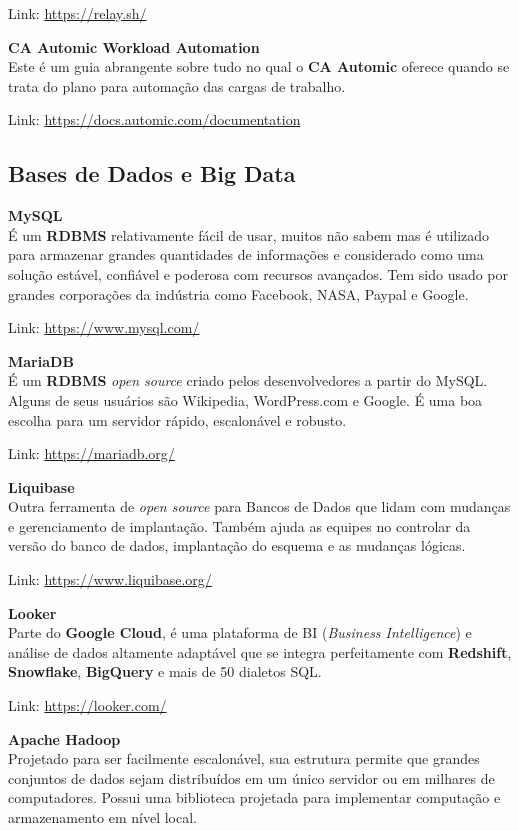 \documentclass[fleqn,10pt]{../sty/SelfArx} %
\begin{document}
Link: \url{https://relay.sh/}

\textbf{CA Automic Workload Automation} \\
Este é um guia abrangente sobre tudo no qual o \textbf{CA Automic} oferece quando se trata do plano para automação das cargas de trabalho.

Link: \url{https://docs.automic.com/documentation}

\subsection*{Bases de Dados e Big Data}

\textbf{MySQL} \\
É um \textbf{RDBMS} relativamente fácil de usar, muitos não sabem mas é utilizado para armazenar grandes quantidades de informações e considerado como uma solução estável, confiável e poderosa com recursos avançados. Tem sido usado por grandes corporações da indústria como Facebook, NASA, Paypal e Google.

Link: \url{https://www.mysql.com/}

\textbf{MariaDB} \\
É um \textbf{RDBMS} \textit{open source} criado pelos desenvolvedores a partir do MySQL. Alguns de seus usuários são Wikipedia, WordPress.com e Google. É uma boa escolha para um servidor rápido, escalonável e robusto.

Link: \url{https://mariadb.org/}

\textbf{Liquibase} \\
Outra ferramenta de \textit{open source} para Bancos de Dados que lidam com mudanças e gerenciamento de implantação. Também ajuda as equipes no controlar da versão do banco de dados, implantação do esquema e as mudanças lógicas.

Link: \url{https://www.liquibase.org/}

\textbf{Looker} \\
Parte do \textbf{Google Cloud}, é uma plataforma de BI (\textit{Business Intelligence}) e análise de dados altamente adaptável que se integra perfeitamente com \textbf{Redshift}, \textbf{Snowflake}, \textbf{BigQuery} e mais de 50 dialetos SQL.

Link: \url{https://looker.com/}

\textbf{Apache Hadoop} \\
Projetado para ser facilmente escalonável, sua estrutura permite que grandes conjuntos de dados sejam distribuídos em um único servidor ou em milhares de computadores. Possui uma biblioteca projetada para implementar computação e armazenamento em nível local.
\end{document}
